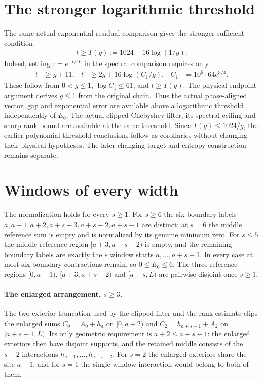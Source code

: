 \documentclass{article}
\begin{document}
\section{The stronger logarithmic threshold}

The same actual exponential residual comparison gives the stronger sufficient
condition
\begin{align*}
 t\ge T(g):=1024+16\log(1/g).
\end{align*}
Indeed, setting $\tau=e^{-t/16}$ in the spectral comparison requires only
\begin{align*}
 t&\ge g+11,&
 t&\ge2g+16\log(C_1/g),& C_1&=10^6\cdot64e^{3/4}.
\end{align*}
These follow from $0<g\le1$, $\log C_1\le61$, and $t\ge T(g)$.
The physical endpoint argument derives $g\le1$ from the original chain.
Thus the actual phase-aligned vector, gap and exponential error are available
above a logarithmic threshold independently of $E_0$.
The actual clipped Chebyshev filter, its spectral ceiling and sharp rank
bound are available at the same threshold. Since $T(g)\le1024/g$, the earlier
polynomial-threshold conclusions follow as corollaries without changing
their physical hypotheses. The later changing-target and entropy
construction remains separate.

\section{Windows of every width}

The normalization holds for every $s\ge1$. For $s\ge6$ the six
boundary labels $a,a+1,a+2,a+s-3,a+s-2,a+s-1$ are distinct; at $s=6$ the
middle reference sum is empty and is normalized by its genuine minimum
zero. For $s\le5$ the middle reference region $[a+3,a+s-2)$ is
empty, and the remaining boundary labels are exactly the $s$ window starts
$a,\ldots,a+s-1$. In every case at most six boundary contractions remain,
so $0\le E_0\le6$. The three reference regions $[0,a+1)$,
$[a+3,a+s-2)$ and $[a+s,L)$ are pairwise disjoint once $s\ge1$.

\paragraph{The enlarged arrangement, $s\ge3$.}
The two-exterior truncation used by the clipped filter and the rank
estimate clips the enlarged sums $C_0=A_0+h_a$ on $[0,a+2)$ and
$C_2=h_{a+s-1}+A_2$ on $[a+s-1,L)$. Its only geometric requirement is
$a+2\le a+s-1$: the enlarged exteriors then have disjoint supports, and
the retained middle consists of the $s-2$ interactions
$h_{a+1},\ldots,h_{a+s-2}$. For $s=2$ the enlarged exteriors share the
site $a+1$, and for $s=1$ the single window interaction would belong to
both of them.
\end{document}
